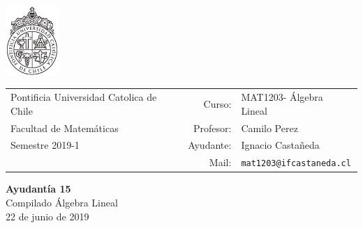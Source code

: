 \documentclass[12pt]{article}
\makeatletter
\newcommand{\ayudantia}{{\sc Ayudantía 15}}
\newcommand{\tituloayu}{Compilado Álgebra Lineal}
\newcommand{\fecha}{22 de junio de 2019}
\newcommand{\sigla}{MAT1203}
\newcommand{\nombre}{Álgebra Lineal}
\newcommand{\profesor}{Camilo Perez}
\newcommand{\ano}{2019}
\newcommand{\semestre}{1}
\newcommand{\mail}{mat1203@ifcastaneda.cl}
\makeatother
\begin{document}
\thispagestyle{empty}

\begin{minipage}{2cm}
	\includegraphics[width=2cm]{../../../../img/logo.pdf}
	\vspace{0.5cm}
\end{minipage}
\begin{minipage}{\linewidth}
	\begin{tabular}{lrl}
		{\scriptsize\sc Pontificia Universidad Catolica de Chile} & \hspace*{0.7in}Curso: &
		\sigla  - \nombre\\
		{\sc Facultad de Matemáticas}&
		Profesor: & \profesor \\
		{\sc Semestre \ano-\semestre} & Ayudante: & {Ignacio Castañeda}\\
		& {Mail:} & \texttt{\mail}
	\end{tabular}
\end{minipage}

\vspace{-10mm}
\begin{center}
	{\LARGE\bf \ayudantia}\\
	\vspace{0.1cm}
	{\tituloayu}\\
	\vspace{0.1cm}
	\fecha\\
	\vspace{0.4cm}
\end{center}
\end{document}
